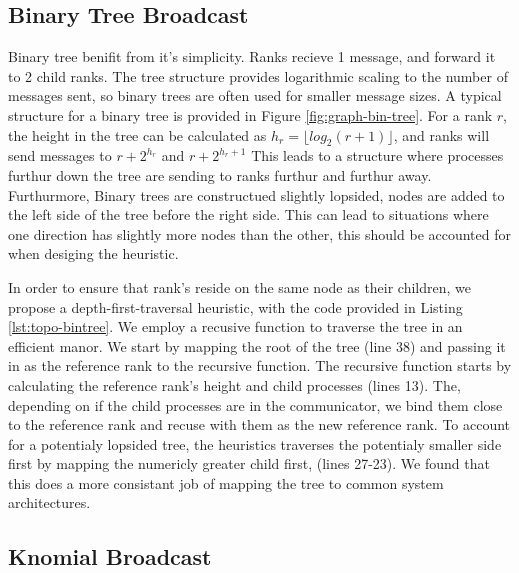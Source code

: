 \subsection{Binary Tree Broadcast}


\lstset{label = lst:topo-bintree}
\lstset{caption = Heuristic for rank reordering binary trees.}


Binary tree benifit from it's simplicity.
Ranks recieve 1 message, and forward it to 2 child ranks.
The tree structure provides logarithmic scaling to the number of messages sent, so binary trees are often used for smaller message sizes. 
A typical structure for a binary tree is provided in Figure \ref{fig:graph-bin-tree}.
For a rank $r$, the height in the tree can be calculated as $h_r = \lfloor log_2(r+1) \rfloor$, and ranks will send messages to $r + 2^{h_r}$ and $r + 2^{h_r + 1}$
This leads to a structure where processes furthur down the tree are sending to ranks furthur and furthur away.
Furthurmore, Binary trees are constructued slightly lopsided, nodes are added to the left side of the tree before the right side. 
This can lead to situations where one direction has slightly more nodes than the other, this should be accounted for when desiging the heuristic.

In order to ensure that rank's reside on the same node as their children, we propose a depth-first-traversal heuristic, with the code provided in Listing \ref{lst:topo-bintree}.
We employ a recusive function to traverse the tree in an efficient manor. 
We start by mapping the root of the tree (line 38) and passing it in as the reference rank to the recursive function.
The recursive function starts by calculating the reference rank's height and child processes (lines 13). 
The, depending on if the child processes are in the communicator, we bind them close to the reference rank and recuse with them as the new reference rank.
To account for a potentialy lopsided tree, the heuristics traverses the potentialy smaller side first by mapping the numericly greater child first, (lines 27-23).
We found that this does a more consistant job of mapping the tree to common system architectures.


\subsection{Knomial Broadcast}

